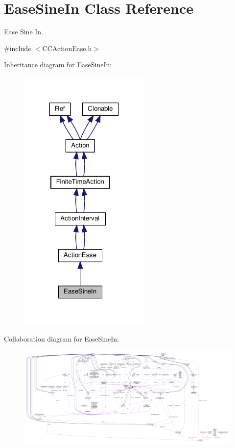 \hypertarget{classEaseSineIn}{}\section{Ease\+Sine\+In Class Reference}
\label{classEaseSineIn}


Ease Sine In.  




{\ttfamily \#include $<$C\+C\+Action\+Ease.\+h$>$}



Inheritance diagram for Ease\+Sine\+In\+:
\nopagebreak
\begin{figure}[H]
\begin{center}
\leavevmode
\includegraphics[width=186pt]{classEaseSineIn__inherit__graph}
\end{center}
\end{figure}


Collaboration diagram for Ease\+Sine\+In\+:
\nopagebreak
\begin{figure}[H]
\begin{center}
\leavevmode
\includegraphics[width=350pt]{classEaseSineIn__coll__graph}
\end{center}
\end{figure}
